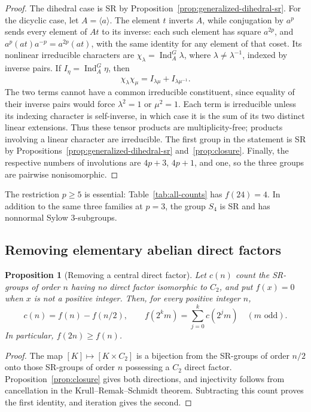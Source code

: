\documentclass[11pt,a4paper]{amsart}
\newtheorem{prop}[thm]{Proposition}
\theoremstyle{definition}
\theoremstyle{remark}
\numberwithin{equation}{section}
\begin{document}
\begin{proof}
The dihedral case is SR by
Proposition~\ref{prop:generalized-dihedral-sr}. For the dicyclic
case, let $A=\langle a\rangle$. The element $t$ inverts $A$,
while conjugation by $a^p$ sends every element of $At$ to its inverse:
each such element has square $a^{2p}$, and
$a^p(at)a^{-p}=a^{2p}(at)$, with the same identity for any element
of that coset. Its nonlinear irreducible characters are
$\chi_\lambda=\operatorname{Ind}_A^G\lambda$, where
$\lambda\ne\lambda^{-1}$, indexed by inverse pairs. If
$I_\eta=\operatorname{Ind}_A^G\eta$, then
\[
 \chi_\lambda\chi_\mu=I_{\lambda\mu}+I_{\lambda\mu^{-1}}.
\]
The two terms cannot have a common irreducible constituent, since
equality of their inverse pairs would force $\lambda^2=1$ or
$\mu^2=1$. Each term is irreducible unless its indexing character
is self-inverse, in which case it is the sum of its two distinct
linear extensions. Thus these tensor products are multiplicity-free;
products involving a linear character are irreducible.
The first group in the statement is SR by
Propositions~\ref{prop:generalized-dihedral-sr} and~\ref{prop:closure}.
Finally, the respective numbers of involutions are $4p+3$, $4p+1$,
and one, so the three groups are pairwise nonisomorphic.
\end{proof}

The restriction $p\ge5$ is essential: Table~\ref{tab:all-counts}
has $f(24)=4$.
In addition to the same three families at $p=3$, the group $S_4$
is SR and has nonnormal Sylow $3$-subgroups.

\subsection{Removing elementary abelian direct factors}
\begin{prop}[Removing a central direct factor]\label{prop:count-c2}
Let $c(n)$ count the SR-groups of order $n$ having no direct factor
isomorphic to $C_2$, and put $f(x)=0$ when $x$ is not a positive integer.
Then, for every positive integer $n$,
\begin{equation}\label{eq:c2-count-recurrence}
 c(n)=f(n)-f(n/2),\qquad
 f(2^k m)=\sum_{j=0}^{k}c(2^j m)\quad(m\text{ odd}).
\end{equation}
In particular, $f(2n)\ge f(n)$.
\end{prop}
\begin{proof}
The map $[K]\mapsto[K\times C_2]$ is a bijection from the SR-groups
of order $n/2$ onto those SR-groups of order $n$ possessing a $C_2$
direct factor. Proposition~\ref{prop:closure} gives both directions, and injectivity follows
from cancellation in the Krull--Remak--Schmidt theorem. Subtracting
this count proves the first identity, and iteration gives the second.
\end{proof}
\end{document}
